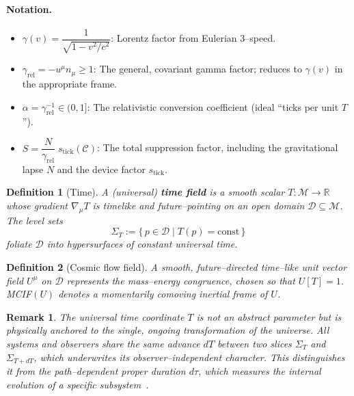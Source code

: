 \documentclass[12pt]{article}
\newtheorem{definition}{Definition}
\theoremstyle{plain}
\newtheorem{remark}{Remark}
\newcommand{\gammarel}{\gamma_{\!\mathrm{rel}}}
\begin{document}
\paragraph{Notation.}
\begin{itemize}
  \item $\gamma(v) = \dfrac{1}{\sqrt{1 - v^2/c^2}}$: Lorentz factor from Eulerian 3–speed.
  \item $\gammarel = -u^\mu n_\mu \geq 1$: The general, covariant gamma factor; reduces to $\gamma(v)$ in the appropriate frame.
  \item $\alpha = \gammarel^{-1} \in (0,1]$: The relativistic conversion coefficient (ideal ``ticks per unit $T$'').
  \item $S = \dfrac{N}{\gammarel}\; s_{\mathrm{tick}}(\mathcal{C})$: The total suppression factor, including the gravitational lapse $N$ and the device factor $s_{\mathrm{tick}}$.
\end{itemize}

\begin{definition}[Time]
A (universal) \textbf{time field} is a smooth scalar $T:\mathcal{M}\to\mathbb{R}$ whose gradient $\nabla_\mu T$ is timelike and future–pointing on an open domain $\mathcal{D}\subseteq\mathcal{M}$. The level sets
\begin{equation}
\Sigma_T := \{\, p \in \mathcal{D} \mid T(p)=\mathrm{const}\,\}
\label{eq:SigmaT}
\end{equation}
foliate $\mathcal{D}$ into hypersurfaces of constant universal time.
\end{definition}

\begin{definition}[Cosmic flow field]
A smooth, future–directed time–like unit vector field $U^\mu$ on $\mathcal{D}$ represents the mass–energy congruence, chosen so that $U[T]=1$. MCIF$(U)$ denotes a momentarily comoving inertial frame of $U$.
\end{definition}

\begin{remark}
The universal time coordinate $T$ is not an abstract parameter but is physically anchored to the single, ongoing transformation of the universe. All systems and observers share the same advance $dT$ between two slices $\Sigma_{T}$ and $\Sigma_{T+dT}$, which underwrites its observer–independent character. This distinguishes it from the path–dependent proper duration $d\tau$, which measures the internal evolution of a specific subsystem~\cite{lorentz1952}.
\end{remark}
\end{document}
